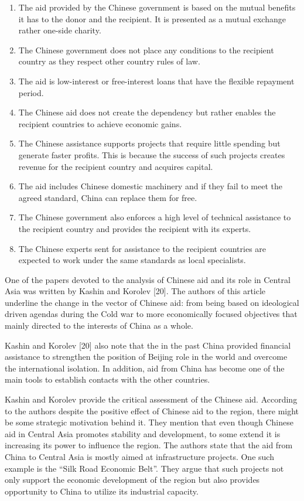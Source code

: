 \begin{enumerate}
\def\labelenumi{\arabic{enumi}.}
\item
  The aid provided by the Chinese government is based on the mutual
  benefits it has to the donor and the recipient. It is presented as a
  mutual exchange rather one-side charity.
\item
  The Chinese government does not place any conditions to the recipient
  country as they respect other country rules of law.
\item
  The aid is low-interest or free-interest loans that have the flexible
  repayment period.
\item
  The Chinese aid does not create the dependency but rather enables the
  recipient countries to achieve economic gains.
\item
  The Chinese assistance supports projects that require little spending
  but generate faster profits. This is because the success of such
  projects creates revenue for the recipient country and acquires
  capital.
\item
  The aid includes Chinese domestic machinery and if they fail to meet
  the agreed standard, China can replace them for free.
\item
  The Chinese government also enforces a high level of technical
  assistance to the recipient country and provides the recipient with
  its experts.
\item
  The Chinese experts sent for assistance to the recipient countries are
  expected to work under the same standards as local specialists.
\end{enumerate}

One of the papers devoted to the analysis of Chinese aid and its role in
Central Asia was written by Kashin and Korolev {[}20{]}. The authors of
this article underline the change in the vector of Chinese aid: from
being based on ideological driven agendas during the Cold war to more
economically focused objectives that mainly directed to the interests of
China as a whole.

Kashin and Korolev {[}20{]} also note that the in the past China
provided financial assistance to strengthen the position of Beijing role
in the world and overcome the international isolation. In addition, aid
from China has become one of the main tools to establish contacts with
the other countries.

Kashin and Korolev provide the critical assessment of the Chinese aid.
According to the authors despite the positive effect of Chinese aid to
the region, there might be some strategic motivation behind it. They
mention that even though Chinese aid in Central Asia promotes stability
and development, to some extend it is increasing its power to influence
the region. The authors state that the aid from China to Central Asia is
mostly aimed at infrastructure projects. One such example is the ``Silk
Road Economic Belt''. They argue that such projects not only support the
economic development of the region but also provides opportunity to
China to utilize its industrial capacity.

